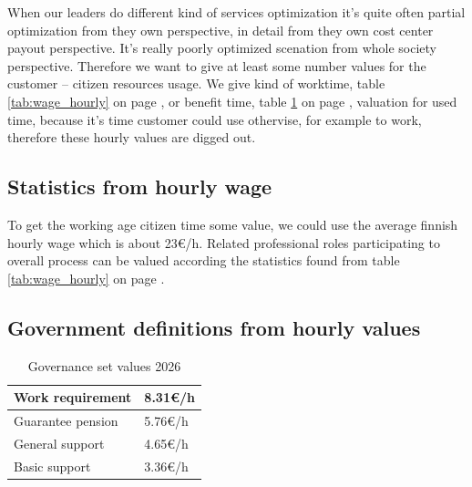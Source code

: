 When our leaders do different kind of services optimization it's quite often
partial optimization from they own perspective, in detail from they own cost
center payout perspective. It's really poorly optimized scenation from whole
society perspective. Therefore we want to give at least some number values
for the customer -- citizen resources usage. We give kind of
worktime, table \ref{tab:wage_hourly} on
page \pageref{tab:wage_hourly}, or benefit time,
table \ref{tab:benefit_hourly} on page \pageref{tab:benefit_hourly},
valuation for used time, because it's time customer could use othervise,
for example to work, therefore these hourly values are digged out.

\subsection{Statistics from hourly wage}
\label{valuation_wage}

To get the working age citizen time some value, we could use the average
finnish hourly wage which is about 23\euro/h. Related professional roles
participating to overall process can be valued according the statistics found
from table \ref{tab:wage_hourly} on page \pageref{tab:wage_hourly}.

\begin{table}
 \begin{center}
  \caption{Hourly wage statistics 2024}
  \label{tab:wage_hourly}
 \end{center}
\end{table}

\subsection{Government definitions from hourly values}
\label{valuation_rate}

\begin{table}
 \begin{center}
  \begin{tabularx}{\textwidth}{|X|X|}\hline
   Work requirement&8.31\euro/h\\\hline
   Guarantee pension&5.76\euro/h\\\hline
   General support&4.65\euro/h\\\hline
   Basic support&3.36\euro/h\\\hline
  \end{tabularx}
  \caption{Governance set values 2026}
  \label{tab:benefit_hourly}
 \end{center}
\end{table}

